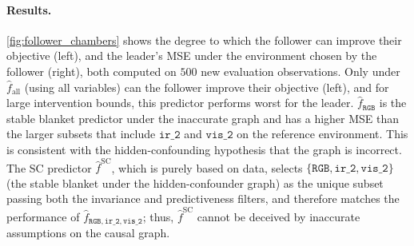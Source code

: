 \paragraph{Results.}
\cref{fig:follower_chambers} 
shows 
the degree to which the follower can improve their objective (left), and the leader's MSE under the environment chosen by the follower (right), both computed on $500$ new evaluation observations.
Only under $\hat{f}_\text{all}$ (using all variables) can the follower improve their objective (left), and for large intervention bounds, this predictor performs worst for the leader. 
%
$\hat{f}_{\mathtt{RGB}}$ is the stable blanket predictor under the inaccurate graph and 
has a higher MSE than the larger subsets that include $\mathtt{ir\_2}$ and $\mathtt{vis\_2}$ on the reference environment. This is consistent with the hidden-confounding hypothesis that the graph is incorrect. 
The SC predictor $\hat{f}^\mathrm{SC}$, which is purely based on data, selects $\{\mathtt{RGB}, \mathtt{ir\_2}, \mathtt{vis\_2}\}$ (the stable blanket under the hidden-confounder graph) as the unique subset passing both the
invariance and predictiveness filters, and therefore matches the performance
of $\hat{f}_{\mathtt{RGB}, \mathtt{ir\_2}, \mathtt{vis\_2}}$; thus, $\hat{f}^\mathrm{SC}$ cannot be deceived
by inaccurate assumptions on the causal graph. 













